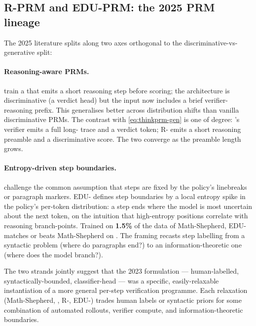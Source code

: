 \subsection{R-PRM and EDU-PRM: the 2025 PRM lineage}
\label{sec:prm-r-edu}

The 2025  literature splits along two axes orthogonal to the
discriminative-vs-generative split:

\paragraph{Reasoning-aware PRMs.} \citet{she2025-r-prm} train a 
that emits a short reasoning step before scoring; the architecture is
discriminative (a verdict head) but the input now includes a brief
verifier-reasoning prefix. This generalises better across distribution
shifts than vanilla discriminative PRMs. The contrast with
\cref{eq:thinkprm-gen} is one of degree: 's verifier emits a
full long- trace and a verdict token; R- emits a short
reasoning preamble and a discriminative score. The two converge as
the preamble length grows.

\paragraph{Entropy-driven step boundaries.} \citet{cao2025-edu-prm}
challenge the common assumption that steps are fixed by the policy's
linebreaks or paragraph markers. EDU- defines step boundaries by a
local entropy spike in the policy's per-token distribution: a step
ends where the model is most uncertain about the next token, on the
intuition that high-entropy positions correlate with reasoning
branch-points. Trained on \textbf{1.5\%} of the data of Math-Shepherd,
EDU- matches or beats Math-Shepherd on
. The framing recasts step labelling from a syntactic
problem (where do paragraphs end?) to an information-theoretic one
(where does the model branch?).

The two strands jointly suggest that the 2023  formulation —
human-labelled, syntactically-bounded, classifier-head — was a
specific, easily-relaxable instantiation of a more general per-step
verification programme. Each relaxation (Math-Shepherd, ,
R-, EDU-) trades human labels or syntactic priors for some
combination of automated rollouts, verifier compute, and
information-theoretic boundaries.

